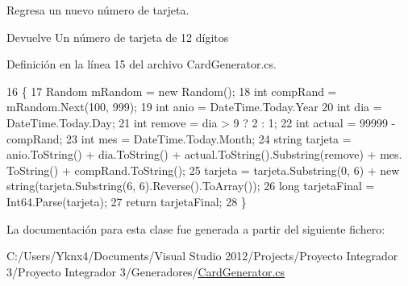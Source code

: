 Regresa un nuevo número de tarjeta. 

\begin{DoxyReturn}{Devuelve}
Un número de tarjeta de 12 dígitos
\end{DoxyReturn}


Definición en la línea 15 del archivo Card\-Generator.\-cs.


\begin{DoxyCode}
16         \{
17             Random mRandom = \textcolor{keyword}{new} Random();
18             \textcolor{keywordtype}{int} compRand = mRandom.Next(100, 999);
19             \textcolor{keywordtype}{int} anio = DateTime.Today.Year %
20             \textcolor{keywordtype}{int} dia = DateTime.Today.Day;
21             \textcolor{keywordtype}{int} \textcolor{keyword}{remove} = dia > 9 ? 2 : 1;
22             \textcolor{keywordtype}{int} actual = 99999 - compRand;
23             \textcolor{keywordtype}{int} mes = DateTime.Today.Month;
24             \textcolor{keywordtype}{string} tarjeta = anio.ToString() + dia.ToString() + actual.ToString().Substring(\textcolor{keyword}{remove}) + mes.
      ToString() + compRand.ToString();
25             tarjeta = tarjeta.Substring(0, 6) + \textcolor{keyword}{new} string(tarjeta.Substring(6, 6).Reverse().ToArray());
26             \textcolor{keywordtype}{long} tarjetaFinal = Int64.Parse(tarjeta);
27             \textcolor{keywordflow}{return} tarjetaFinal;
28         \}
\end{DoxyCode}


La documentación para esta clase fue generada a partir del siguiente fichero\-:\begin{DoxyCompactItemize}
\item 
C\-:/\-Users/\-Yknx4/\-Documents/\-Visual Studio 2012/\-Projects/\-Proyecto Integrador 3/\-Proyecto Integrador 3/\-Generadores/\hyperlink{_card_generator_8cs}{Card\-Generator.\-cs}\end{DoxyCompactItemize}
